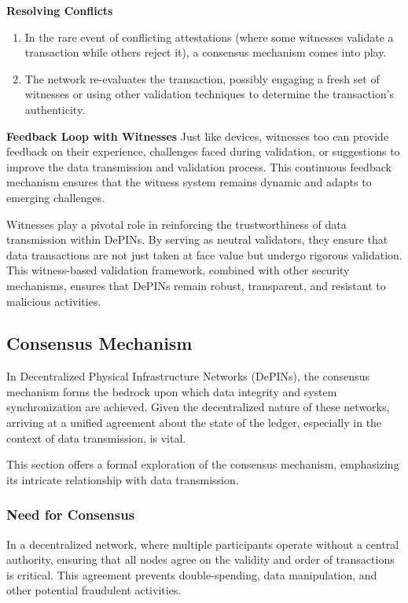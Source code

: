 \documentclass{article}
\begin{document}
\textbf{Resolving Conflicts}
\begin{enumerate}
\item In the rare event of conflicting attestations (where some witnesses validate a transaction while others reject it), a consensus mechanism comes into play.
\item The network re-evaluates the transaction, possibly engaging a fresh set of witnesses or using other validation techniques to determine the transaction's authenticity.
\end{enumerate}

\textbf{Feedback Loop with Witnesses} Just like devices, witnesses too can provide feedback on their experience, challenges faced during validation, or suggestions to improve the data transmission and validation process. This continuous feedback mechanism ensures that the witness system remains dynamic and adapts to emerging challenges.

Witnesses play a pivotal role in reinforcing the trustworthiness of data transmission within DePINs. By serving as neutral validators, they ensure that data transactions are not just taken at face value but undergo rigorous validation. This witness-based validation framework, combined with other security mechanisms, ensures that DePINs remain robust, transparent, and resistant to malicious activities.

\subsection{Consensus Mechanism}

In Decentralized Physical Infrastructure Networks (DePINs), the consensus mechanism forms the bedrock upon which data integrity and system synchronization are achieved. Given the decentralized nature of these networks, arriving at a unified agreement about the state of the ledger, especially in the context of data transmission, is vital. 

This section offers a formal exploration of the consensus mechanism, emphasizing its intricate relationship with data transmission.

\subsubsection{Need for Consensus} 

In a decentralized network, where multiple participants operate without a central authority, ensuring that all nodes agree on the validity and order of transactions is critical. This agreement prevents double-spending, data manipulation, and other potential fraudulent activities.
\end{document}
